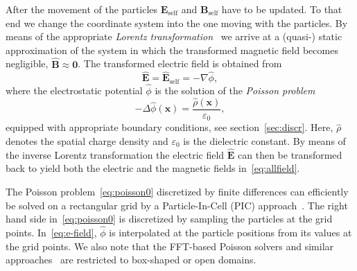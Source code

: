 \documentclass[a4paper,10pt,3p,final,pdftex]{elsarticle}
\newcommand {\RM}[1]{\mathrm{#1}}
\begin{document}
After the movement of the particles 
$\mathbf{E_{\RM{self}}}$ and $\mathbf{B_{\RM{self}}}$ have to be updated.  
To that end we change the coordinate system into the one moving with the
particles.  By means of the appropriate \emph{Lorentz
  transformation}~\cite{lali:84} we arrive at a (quasi-) static
approximation of the system in which the transformed magnetic field
becomes negligible, $\hat{\mathbf{B}}\! \approx\! \mathbf{0}$.  The
transformed electric field is obtained from
\begin{equation}\label{eq:e-field}
  \hat{\mathbf{E}}=\hat{\mathbf{E}}_{\RM{self}}=-\nabla\hat{\phi},
\end{equation}
where the electrostatic potential $\hat{\phi}$ is the solution of the
\emph{Poisson problem}
\begin{equation}\label{eq:poisson0}
  - \Delta \hat{\phi}(\mathbf{x}) =
  \frac{\hat{\rho}(\mathbf{x})}{\varepsilon_0},
\end{equation}
equipped with appropriate boundary conditions, see
section~\ref{sec:discr}.  Here, $\hat{\rho}$ denotes the spatial charge
density and $\varepsilon_0$ is the dielectric constant.
By means of the inverse Lorentz transformation the electric field
$\hat{\mathbf{E}}$ can then be transformed back to yield both the
electric and the magnetic fields in~\eqref{eq:allfield}.

The Poisson problem~\eqref{eq:poisson0} discretized by finite
differences can efficiently be solved on a rectangular grid by a
Particle-In-Cell (PIC) approach~\cite{qiry:01}.  The right hand side
in~\eqref{eq:poisson0} is discretized by sampling the particles at the
grid points.  In~\eqref{eq:e-field}, $\hat{\phi}$ is interpolated at the
particle positions from its values at the grid points. We also note that
the FFT-based Poisson solvers and similar
approaches~\cite{qiry:01,qigl:04} are restricted to box-shaped or open domains.
\end{document}
